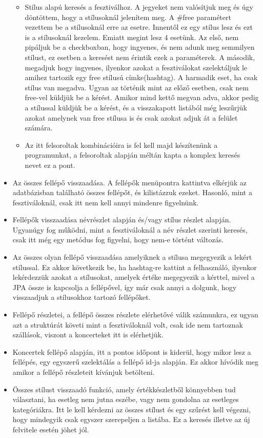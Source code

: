 \begin{itemize}
\begin{itemize}
\item Stílus alapú keresés a fesztiválhoz. A jegyeket nem valósítjuk meg és úgy döntöttem, hogy a stílusoknál jelenítem meg. A \#free paramétert vezettem be a stílusoknál erre az esetre. Innentől ez egy stílus lesz és ezt is a stílusoknál kezelem. Emiatt megint lesz 4 esetünk. Az első, nem pipáljuk be a checkboxban, hogy ingyenes, és nem adunk meg semmilyen stílust, ez esetben a keresést nem érintik ezek a paraméterek. A második, megadjuk hogy ingyenes, ilyenkor azokat a fesztiválokat szelektáljuk le amihez tartozik egy free stílusú címke(hashtag). A harmadik eset, ha csak stílus van megadva. Ugyan az történik mint az előző esetben, csak nem free-vel küldjük be a kérést. Amikor mind kettő megvan adva, akkor pedig a stílussal küldjük be a kérést, és a visszakapott listából még leszűrjük azokat amelynek van free stílusa is és csak azokat adjuk át a felület számára.
\item Az itt felsoroltak kombinációira is fel kell majd készítenünk a programunkat, a felsoroltak alapján méltán kapta a komplex keresés nevet ez a pont.
\end{itemize}

\item Az összes fellépő visszaadása. A fellépők menüpontra kattintva elkérjük az adatbázisban található összes fellépőt, és kilistázzuk ezeket. Hasonló, mint a fesztiváloknál, csak itt nem kell annyi mindenre figyelnünk.

\item Fellépők visszaadása névrészlet alapján és/vagy stílus részlet alapján. Ugyanúgy fog működni, mint a fesztiváloknál a név részlet szerinti keresés, csak itt még egy metódus fog figyelni, hogy nem-e történt változás. 

\item Az összes olyan fellépő visszaadása amelyiknek a stílusa megegyezik a lekért stílussal. Ez akkor következik be, ha hashtag-re kattint a felhasználó, ilyenkor lekérdezzük azokat a stílusokat, amelyek értéke megegyezik a kérttel, mivel a JPA össze is kapcsolja a fellépővel, így már csak annyi a dolgunk, hogy visszaadjuk a stílusokhoz tartozó fellépőket.

\item Fellépő részletei, a fellépő összes részlete elérhetővé válik számunkra, ez ugyan azt a struktúrát követi mint a fesztiváloknál volt, csak ide nem tartoznak szállások, viszont a koncerteket itt is elérhetjük.

\item Koncertek fellépő alapján, itt a pontos időpont is kiderül, hogy mikor lesz a fellépés, egy egyszerű szelektálás a fellépő id-ja alapján. Ez akkor hívódik meg amikor a fellépő részleteit kívánjuk betölteni.

\item Összes stílust visszaadó funkció, amely értékkészletből könnyebben tud választani, ha esetleg nem jutna eszébe, vagy nem gondolna az esetleges kategóriákra. Itt le kell kérdezni az összes stílust és egy szűrést kell végezni, hogy mindegyik csak egyszer szerepeljen a listába. Ez a keresés illetve az új felvitele esetén jöhet jól.
\end{itemize}

